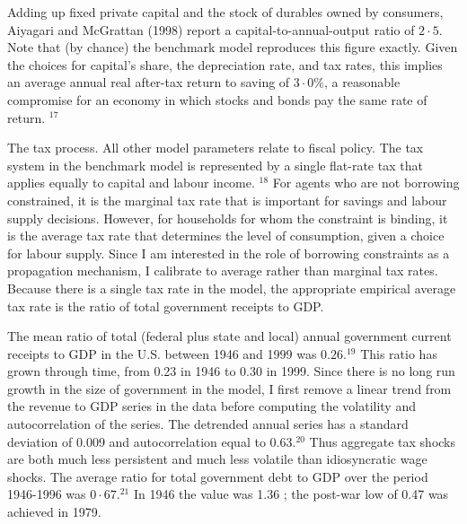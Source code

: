 \documentclass[11pt]{article}
\begin{document}
Adding up fixed private capital and the stock of durables owned by consumers, Aiyagari and McGrattan (1998) report a capital-to-annual-output ratio of $2 \cdot 5$. Note that (by chance) the benchmark model reproduces this figure exactly. Given the choices for capital's share, the depreciation rate, and tax rates, this implies an average annual real after-tax return to saving of $3 \cdot 0 \%$, a reasonable compromise for an economy in which stocks and bonds pay the same rate of return. ${ }^{17}$

The tax process. All other model parameters relate to fiscal policy. The tax system in the benchmark model is represented by a single flat-rate tax that applies equally to capital and labour income. ${ }^{18}$ For agents who are not borrowing constrained, it is the marginal tax rate that is important for savings and labour supply decisions. However, for households for whom the constraint is binding, it is the average tax rate that determines the level of consumption, given a choice for labour supply. Since I am interested in the role of borrowing constraints as a propagation mechanism, I calibrate to average rather than marginal tax rates. Because there is a single tax rate in the model, the appropriate empirical average tax rate is the ratio of total government receipts to GDP.

The mean ratio of total (federal plus state and local) annual government current receipts to GDP in the U.S. between 1946 and 1999 was $0.26 .^{19}$ This ratio has grown through time, from 0.23 in 1946 to 0.30 in 1999. Since there is no long run growth in the size of government in the model, I first remove a linear trend from the revenue to GDP series in the data before computing the volatility and autocorrelation of the series. The detrended annual series has a standard deviation of 0.009 and autocorrelation equal to $0.63 .{ }^{20}$ Thus aggregate tax shocks are both much less persistent and much less volatile than idiosyncratic wage shocks. The average ratio for total government debt to GDP over the period 1946-1996 was $0 \cdot 67 .{ }^{21}$ In 1946 the value was 1.36 ; the post-war low of 0.47 was achieved in 1979.
\end{document}
